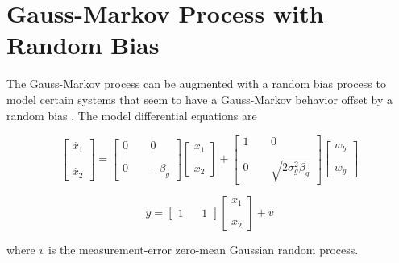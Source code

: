 \documentclass[12pt]{article}
\begin{document}
\clearpage
\section{Gauss-Markov Process with Random Bias}

The Gauss-Markov process can be augmented with a random bias process to model certain
systems that seem to have a Gauss-Markov behavior offset by a random bias \cite{rgbrown1983}.
The model differential equations are

\begin{equation}
    \begin{bmatrix}
    \dot{x_1} \\
    \phantom{m} \\
    \dot{x_2}
    \end{bmatrix}
    =
    \begin{bmatrix}
    0 & & 0 \\
    \phantom{m} \\
    0 & & -\beta_g
    \end{bmatrix}
    \begin{bmatrix}
    x_1 \\
    \phantom{m} \\
    x_2
    \end{bmatrix}
    +
    \begin{bmatrix}
    1 & & 0 \\
    \phantom{m} \\
    0 & & \sqrt{2 \sigma_g^2 \beta_g}
    \end{bmatrix}
    \begin{bmatrix}
    w_b \\
    \phantom{m} \\
    w_g
    \end{bmatrix}
    \label{eq:GMRB-differential-system}
\end{equation}

\begin{equation}
    y = 
    \begin{bmatrix}
    1 & & 1
    \end{bmatrix}
    \begin{bmatrix}
    x_1 \\
    \phantom{m} \\
    x_2
    \end{bmatrix}
    +
    v
    \label{eq:GMRB-observation}
\end{equation}

where $v$ is the measurement-error zero-mean Gaussian random process.
\end{document}
